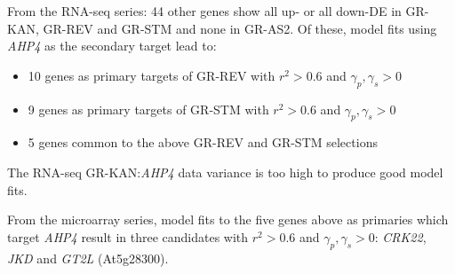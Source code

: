 \documentclass[aspb,landscape]{a0poster}
\begin{document}
\begin{multicols}{3}
  From the RNA-seq series: 44 other genes show all up- or all down-DE in GR-KAN, GR-REV and GR-STM and none in GR-AS2.
  Of these, model fits using \textit{AHP4} as the secondary target lead to:
  \begin{itemize}
  \item 10 genes as primary targets of GR-REV with $r^2>0.6$ and $\gamma_p,\gamma_s>0$
  \item 9 genes as primary targets of GR-STM with $r^2>0.6$ and $\gamma_p,\gamma_s>0$
  \item 5 genes common to the above GR-REV and GR-STM selections
  \end{itemize}
  The RNA-seq GR-KAN:\textit{AHP4} data variance is too high to produce good model fits.

  From the microarray series, model fits to the five genes above as primaries which target \textit{AHP4} result in
  three candidates with $r^2>0.6$ and $\gamma_p,\gamma_s>0$: \textit{CRK22}, \textit{JKD} and \textit{GT2L} (At5g28300).


\end{multicols}
\end{document}
